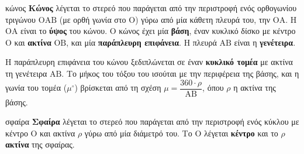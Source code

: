 \begin{orismos}{κώνος}
\textbf{Κώνος} λέγεται το στερεό που παράγεται από την περιστροφή ενός ορθογωνίου τριγώνου $\mathrm{ΟΑΒ}$ (με ορθή γωνία στο $\mathrm{Ο}$) γύρω από μία κάθετη πλευρά του, την $\mathrm{ΟΑ}$. Η $\mathrm{ΟΑ}$ είναι το \textbf{ύψος} του κώνου. Ο κώνος έχει μία \textbf{βάση}, έναν κυκλικό δίσκο με κέντρο $\mathrm{Ο}$ και \textbf{ακτίνα} $\mathrm{ΟΒ}$, και μία \textbf{παράπλευρη επιφάνεια}. Η πλευρά $\mathrm{ΑΒ}$ είναι η \textbf{γενέτειρα}.
\end{orismos}

Η παράπλευρη επιφάνεια του κώνου ξεδιπλώνεται σε έναν \textbf{κυκλικό τομέα} με ακτίνα τη γενέτειρα $\mathrm{ΑΒ}$. Το μήκος του τόξου του ισούται με την περιφέρεια της βάσης, και η γωνία του τομέα ($\mu^\circ$) βρίσκεται από τη σχέση $\mu=\dfrac{360\cdot\rho}{\mathrm{ΑΒ}}$, όπου $\rho$ η ακτίνα της βάσης.

\begin{center}
\end{center}

\begin{orismos}{σφαίρα}
\textbf{Σφαίρα} λέγεται το στερεό που παράγεται από την περιστροφή ενός κύκλου με κέντρο $\mathrm{Ο}$ και ακτίνα $\rho$ γύρω από μία διάμετρό του. Το $\mathrm{Ο}$ λέγεται \textbf{κέντρο} και το $\rho$ \textbf{ακτίνα} της σφαίρας.
\end{orismos}

\begin{center}
\end{center}

